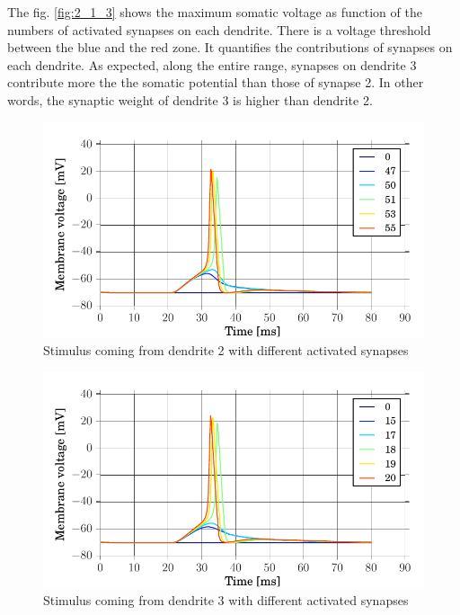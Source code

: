\documentclass[a4paper, 10pt, conference]{ieeeconf}      %
\begin{document}
The fig. \ref{fig:2_1_3} shows the maximum somatic voltage as function of the numbers of activated synapses on each dendrite. There is a voltage threshold between the blue and the red zone. It quantifies the contributions of synapses on each dendrite. As expected, along the entire range, synapses on dendrite 3 contribute more the the somatic potential than those of synapse 2. In other words, the synaptic weight of dendrite 3 is higher than dendrite 2. \\

\begin{figure}
\begin{center}
\includegraphics[width=\columnwidth]{../figures/2_1-dend2_synapse_number.pdf}
\end{center}
\label{fig:2_1_1}
\caption{Stimulus coming from dendrite 2 with different activated synapses}
\end{figure}

\begin{figure}
\begin{center}
\includegraphics[width=\columnwidth]{../figures/2_1-dend3_synapse_number.pdf}
\end{center}
\label{fig:2_1_2}
\caption{Stimulus coming from dendrite 3 with different activated synapses}
\end{figure}
\end{document}
